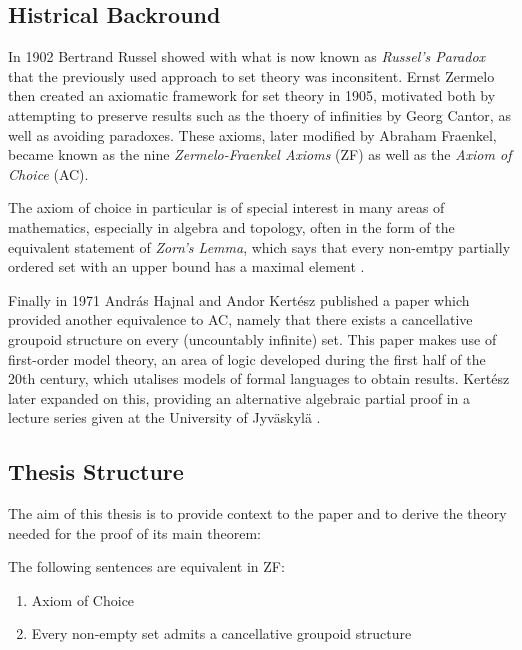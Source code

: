 \documentclass[../../main.tex]{subfiles}
\begin{document}
\subsection*{Histrical Backround}

In 1902 Bertrand Russel showed with what is now known as \textit{Russel's Paradox} that the previously used approach to set theory was inconsitent.
Ernst Zermelo then created an axiomatic framework for set theory in 1905, motivated both by attempting to preserve results such as the thoery of infinities by Georg Cantor, as well as avoiding paradoxes.
These axioms, later modified by Abraham Fraenkel, became known as the nine \textit{Zermelo-Fraenkel Axioms} (ZF) as well as the \textit{Axiom of Choice} (AC)\cite[pp.66-70, 75]{Gol17}.

The axiom of choice in particular is of special interest in many areas of mathematics, especially in algebra and topology, often in the form of the equivalent statement of \textit{Zorn's Lemma},
which says that every non-emtpy partially ordered set with an upper bound has a maximal element \cite{Jec78}.

Finally in 1971 András Hajnal and Andor Kertész published a paper \cite{Haj72} which provided another equivalence to AC, namely that there exists a cancellative groupoid structure on every (uncountably infinite) set.
This paper makes use of first-order model theory, an area of logic developed during the first half of the 20th century, which utalises models of formal languages to obtain results.
Kertész later expanded on this, providing an alternative algebraic partial proof in a lecture series given at the University of Jyväskylä \cite{Ker75}.

\subsection*{Thesis Structure}

The aim of this thesis is to provide context to the paper \cite{Haj72} and to derive the theory needed for the proof of its main theorem:
\begin{theorem}
    The following sentences are equivalent in ZF:
    \begin{enumerate}
        \item Axiom of Choice
        \item Every non-empty set admits a cancellative groupoid structure
    \end{enumerate}
\end{theorem}
\end{document}
